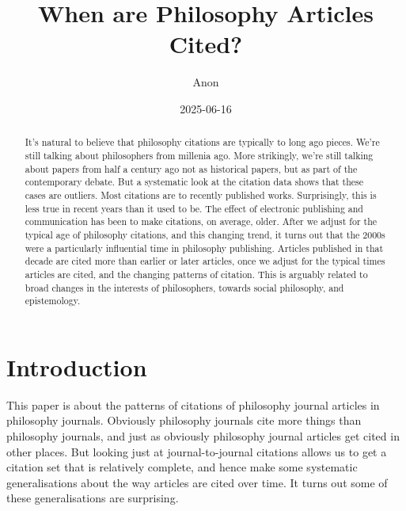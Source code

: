 \documentclass[
  12pt,
  letterpaper,
  DIV=11,
  numbers=noendperiod]{scrartcl}
\title{When are Philosophy Articles Cited?}
\author{Anon}
\date{2025-06-16}
\begin{document}
\maketitle
\begin{abstract}
It's natural to believe that philosophy citations are typically to long
ago pieces. We're still talking about philosophers from millenia ago.
More strikingly, we're still talking about papers from half a century
ago not as historical papers, but as part of the contemporary debate.
But a systematic look at the citation data shows that these cases are
outliers. Most citations are to recently published works. Surprisingly,
this is less true in recent years than it used to be. The effect of
electronic publishing and communication has been to make citations, on
average, older. After we adjust for the typical age of philosophy
citations, and this changing trend, it turns out that the 2000s were a
particularly influential time in philosophy publishing. Articles
published in that decade are cited more than earlier or later articles,
once we adjust for the typical times articles are cited, and the
changing patterns of citation. This is arguably related to broad changes
in the interests of philosophers, towards social philosophy, and
epistemology.
\end{abstract}


\section{Introduction}\label{sec-introduction}

This paper is about the patterns of citations of philosophy journal
articles in philosophy journals. Obviously philosophy journals cite more
things than philosophy journals, and just as obviously philosophy
journal articles get cited in other places. But looking just at
journal-to-journal citations allows us to get a citation set that is
relatively complete, and hence make some systematic generalisations
about the way articles are cited over time. It turns out some of these
generalisations are surprising.
\end{document}
